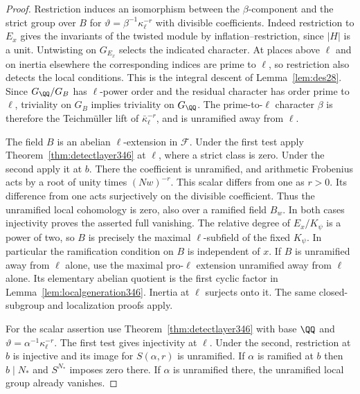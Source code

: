 \documentclass[a4paper,11pt]{article}
\theoremstyle{definition}
\theoremstyle{remark}
\numberwithin{equation}{section}
\begin{document}
\begin{proof}
Restriction induces an isomorphism between the $\beta$-component
and the strict group over $B$ for
$\vartheta=\beta^{-1}\kappa_\ell^{-r}$ with divisible coefficients.
Indeed restriction to $E_x$ gives the invariants of the twisted
module by inflation--restriction, since $|H|$ is a unit. Untwisting
on $G_{E_x}$ selects the indicated character. At places above
$\ell$ and on inertia elsewhere the corresponding indices are
prime to $\ell$, so restriction also detects the local conditions.
This is the integral descent of Lemma~\ref{lem:des28}.
Since $G_\QQ/G_B$ has $\ell$-power order and the residual
character has order prime to $\ell$, triviality on $G_B$
implies triviality on $G_\QQ$. The prime-to-$\ell$ character
$\beta$ is therefore the Teichm\"uller lift of
$\bar\kappa_\ell^{-r}$, and is unramified away from $\ell$.

The field $B$ is an abelian $\ell$-extension in $\mathcal F$.
Under the first test apply Theorem~\ref{thm:detectlayer346} at
$\ell$, where a strict class is zero. Under the second apply it
at $b$. There the coefficient is unramified, and arithmetic
Frobenius acts by a root of unity times $(Nw)^{-r}$. This scalar
differs from one as $r>0$. Its difference from one acts
surjectively on the divisible coefficient. Thus the unramified
local cohomology is zero, also over a ramified field $B_w$.
In both cases injectivity proves the asserted full vanishing.
The relative degree of $E_x/K_\psi$ is a power of two, so $B$
is precisely the maximal $\ell$-subfield of the fixed $K_\psi$.
In particular the ramification condition on $B$ is independent
of $x$. If $B$ is unramified away from $\ell$ alone, use the
maximal pro-$\ell$ extension unramified away from $\ell$ alone.
Its elementary abelian quotient is the first cyclic factor in
Lemma~\ref{lem:localgeneration346}. Inertia at $\ell$ surjects
onto it. The same closed-subgroup and localization proofs apply.

For the scalar assertion use Theorem~\ref{thm:detectlayer346}
with base $\QQ$ and $\vartheta=\alpha^{-1}\kappa_\ell^{-r}$.
The first test gives injectivity at $\ell$. Under the second,
restriction at $b$ is injective and its image for $S(\alpha,r)$
is unramified. If $\alpha$ is ramified at $b$ then $b\mid N_*$
and $S^{N_*}$ imposes zero there. If $\alpha$ is unramified
there, the unramified local group already vanishes.
\end{proof}
\end{document}
